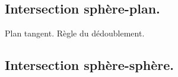 \subsection{Intersection sphère-plan.}
Plan tangent. Règle du dédoublement.
\subsection{Intersection sphère-sphère.}

